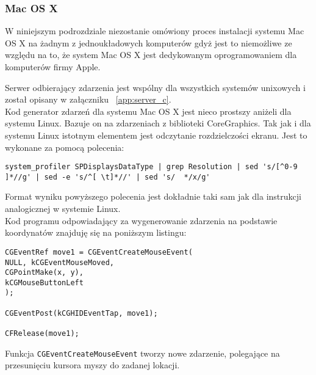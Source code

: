\subsubsection{Mac OS X}

W niniejszym podrozdziale niezostanie omówiony proces instalacji systemu Mac OS X na żadnym z jednoukładowych komputerów gdyż jest to niemożliwe ze względu na to, że system Mac OS X jest dedykowanym oprogramowaniem dla komputerów firmy Apple. 

Serwer odbierający zdarzenia jest wspólny dla wszystkich systemów unixowych i został opisany w załączniku ~\ref{app:server_c}.
\\
Kod generator zdarzeń dla systemu Mac OS X jest nieco prostszy aniżeli dla systemu Linux. Bazuje on na zdarzeniach z biblioteki CoreGraphics. Tak jak i dla systemu Linux istotnym elementem jest odczytanie rozdzielczości ekranu. Jest to wykonane za pomocą polecenia:
\begin{lstlisting}
system_profiler SPDisplaysDataType | grep Resolution | sed 's/[^0-9 ]*//g' | sed -e 's/^[ \t]*//' | sed 's/  */x/g'
\end{lstlisting}
Format wyniku powyższego polecenia jest dokładnie taki sam jak dla instrukcji analogicznej w systemie Linux.
\\
Kod programu odpowiadający za wygenerowanie zdarzenia na podstawie koordynatów znajduję się na poniższym listingu:
\begin{lstlisting}
CGEventRef move1 = CGEventCreateMouseEvent(
NULL, kCGEventMouseMoved,
CGPointMake(x, y),
kCGMouseButtonLeft
);

CGEventPost(kCGHIDEventTap, move1);

CFRelease(move1);
\end{lstlisting}

Funkcja \lstinline{CGEventCreateMouseEvent} tworzy nowe zdarzenie, polegające na przesunięciu kursora myszy do zadanej lokacji.
